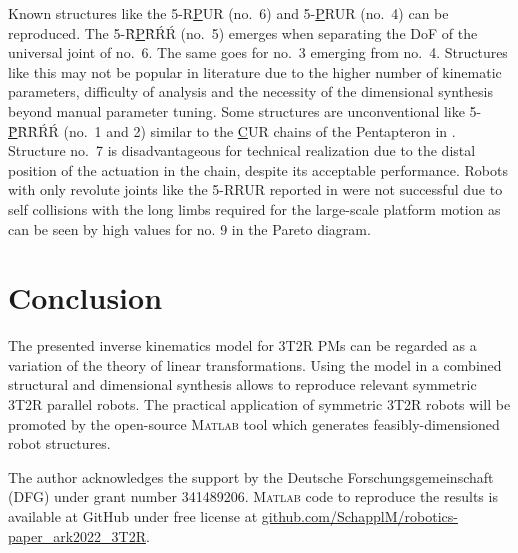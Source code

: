 \documentclass[
	graybox,
	vecphys] %
	{svmult}
\begin{document}
Known structures like the 5-R\underline{P}UR (no.~6) \cite{MasoulehGosHusWal2011,AmineMasCarWen2012,GallardoAlvaradoAbeIsl2019} and 5-\underline{P}RUR (no.~4) \cite{MasoulehSaaGosTag2010} can be reproduced.
The 5-{\`R}\underline{P}{\`R}{\'R}{\'R} (no.~5) emerges when separating the DoF of the universal joint of no.~6.
The same goes for no.~3 emerging from no.~4.
Structures like this may not be popular in literature due to the higher number of kinematic parameters, difficulty of analysis and the necessity of the dimensional synthesis beyond manual parameter tuning.
Some structures are unconventional like 5-\underline{\`P}{\`R}{\`R}{\'R}{\'R} (no.~1 and 2) similar to the \underline{C}UR chains of the Pentapteron in \cite{MasoulehSaaGosTag2010}.
Structure no.~7 is disadvantageous for technical realization due to the distal position of the actuation in the chain, despite its acceptable performance.
Robots with only revolute joints like the 5-RRUR reported in \cite{CaoDinYan2017} were not successful due to self collisions with the long limbs required for the large-scale platform motion as can be seen by high values for no. 9 in the Pareto diagram.

\section{Conclusion}
\label{sec:conclusion}
\vspace{-0.1cm} %

The presented inverse kinematics model for 3T2R PMs can be regarded as a variation of the theory of linear transformations.
Using the model in a combined structural and dimensional synthesis allows to reproduce relevant symmetric 3T2R parallel robots. %
The practical application of symmetric 3T2R robots will be promoted by the open-source \textsc{Matlab} tool which generates feasibly-dimensioned robot structures. %

\vspace{-0.3cm}
\begin{acknowledgement}
The author acknowledges the support by the Deutsche Forschungsgemeinschaft (DFG) under grant number 341489206. \textsc{Matlab} code to reproduce the results
is available at GitHub under free license at \url{github.com/SchapplM/robotics-paper_ark2022_3T2R}.
%
\end{acknowledgement}

\vspace{-0.5cm}


\end{document}
